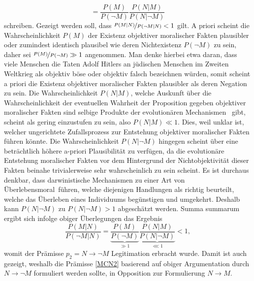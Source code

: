 \documentclass[a4paper,11pt]{article}
\numberwithin{equation}{section}
\begin{document}
\begin{equation}
= \frac{P(M)}{P(\neg M)}\frac{P(N|M)}{P(N|\neg M)}\end{equation} schreiben. Gezeigt werden soll, dass $\nicefrac{P(M|N)}{P(\neg M | N)} < 1$ gilt. A priori scheint die Wahrscheinlichkeit $P(M)$ der Existenz objektiver moralischer Fakten plausibler oder zumindest identisch plausibel wie deren Nichtexistenz $P(\neg M)$ zu sein, daher sei $\nicefrac{P(M)}{P(\neg M)} \gg 1$ angenommen. Man denke hierbei etwa daran, dass viele Menschen die Taten Adolf Hitlers an jüdischen Menschen im Zweiten Weltkrieg als objektiv böse oder objektiv falsch bezeichnen würden, somit scheint a priori die Existenz objektiver moralischer Fakten plausibler als deren Negation zu sein. Die Wahrscheinlichkeit $P(N|M)$, welche Auskunft über die Wahrscheinlichkeit der eventuellen Wahrheit der Proposition \flqq gegeben objektiver moralischer Fakten sind selbige Produkte der evolutionären Mechanismen \frqq\ gibt, scheint als gering einzustufen zu sein, also $P(N|M) \ll 1$. Dies, weil unklar ist, welcher ungerichtete Zufallsprozess zur Entstehung objektiver moralischer Fakten führen könnte. Die Wahrscheinlichkeit $P(N|\neg M)$ hingegen scheint über eine beträchtlich höhere a-priori Plausibilität zu verfügen, da die evolutionäre Entstehung moralischer Fakten vor dem Hintergrund der Nichtobjektivität dieser Fakten beinahe trivialerweise sehr wahrscheinlich zu sein scheint. Es ist durchaus denkbar, dass darwinistische Mechanismen zu einer Art von \flqq Überlebensmoral\frqq\ führen, welche diejenigen Handlungen als richtig beurteilt, welche das Überleben eines Individuums begünstigen und umgekehrt. Deshalb kann $P(N|\neg M)$ zu $P(N|\neg M) > 1$ abgeschätzt werden. Summa summarum ergibt sich infolge obiger Überlegungen das Ergebnis \begin{equation}
\frac{P(M|N)}{P(\neg M|N)} = \underbrace{\frac{P(M)}{P(\neg M)}}_{\gg 1}\underbrace{\frac{P(N|M)}{P(N|\neg M)}}_{\lll 1} < 1,
\end{equation} womit der Prämisse $p_2 = N \rightarrow \neg M$ Legitimation erbracht wurde. Damit ist auch gezeigt, weshalb die Prämisse \ref{MCN2} basierend auf obiger Argumentation durch $N \rightarrow \neg M$ formuliert werden sollte, in Opposition zur Formulierung $N \rightarrow M$.
\end{document}

